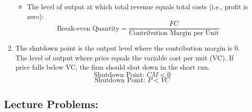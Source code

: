 \documentclass[
]{book}
\providecommand{\tightlist}{%
  \setlength{\itemsep}{0pt}\setlength{\parskip}{0pt}}
\begin{document}
\begin{enumerate}
  \begin{itemize}
  \tightlist
  \item
    The level of output at which total revenue equals total costs (i.e., profit is zero):
    \[
     \text{Break-even Quantity} = \frac{FC}{\text{Contribution Margin per Unit}}
     \]
  \end{itemize}
\item
  The shutdown point is the output level where the contribution margin is 0. The level of output where price equals the variable cost per unit (VC). If price falls below VC, the firm should shut down in the short run.
  \[
   \text{Shutdown Point: } CM < 0
   \]
  \[
   \text{Shutdown Point: } P < VC
   \]
\end{enumerate}

\subsection*{Lecture Problems:}\label{lecture-problems-4}
\end{document}
